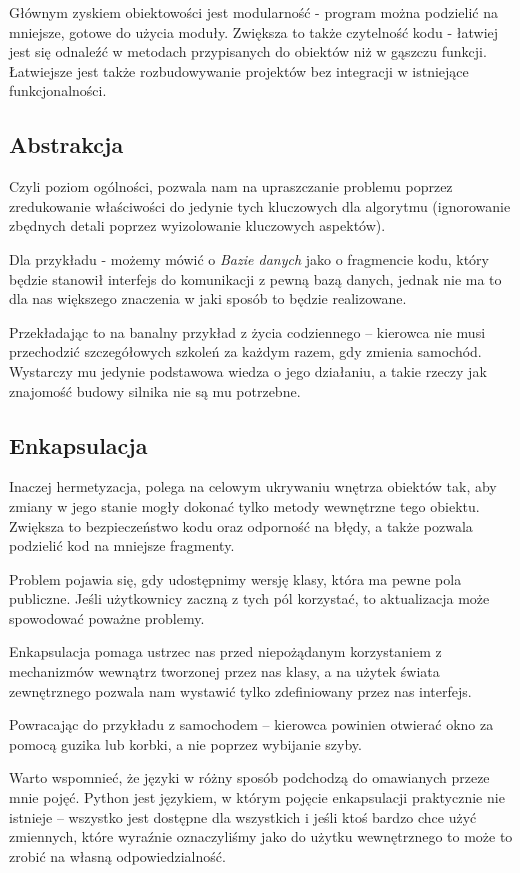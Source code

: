 Głównym zyskiem obiektowości jest modularność - program można podzielić na mniejsze, gotowe do użycia moduły. Zwiększa to także czytelność kodu - łatwiej jest się odnaleźć w metodach przypisanych do obiektów niż w gąszczu funkcji. Łatwiejsze jest także rozbudowywanie projektów bez integracji w istniejące funkcjonalności.

\subsection{Abstrakcja}
Czyli poziom ogólności, pozwala nam na upraszczanie problemu poprzez zredukowanie właściwości do jedynie tych kluczowych dla algorytmu (ignorowanie zbędnych detali poprzez wyizolowanie kluczowych aspektów).

Dla przykładu - możemy mówić o \textit{Bazie danych} jako o fragmencie kodu, który będzie stanowił interfejs do komunikacji z pewną bazą danych, jednak nie ma to dla nas większego znaczenia w jaki sposób to będzie realizowane.

Przekładając to na banalny przykład z życia codziennego -- kierowca nie musi przechodzić szczegółowych szkoleń za każdym razem, gdy zmienia samochód.
Wystarczy mu jedynie podstawowa wiedza o jego działaniu, a takie rzeczy jak znajomość budowy silnika nie są mu potrzebne.

\subsection{Enkapsulacja}
Inaczej hermetyzacja, polega na celowym ukrywaniu wnętrza obiektów tak, aby zmiany w jego stanie mogły dokonać tylko metody wewnętrzne tego obiektu. Zwiększa to bezpieczeństwo kodu oraz odporność na błędy, a także pozwala podzielić kod na mniejsze fragmenty.

Problem pojawia się, gdy udostępnimy wersję klasy, która ma pewne pola publiczne.
Jeśli użytkownicy zaczną z tych pól korzystać, to aktualizacja może spowodować poważne problemy.

Enkapsulacja pomaga ustrzec nas przed niepożądanym korzystaniem z mechanizmów wewnątrz tworzonej przez nas klasy, a na użytek świata zewnętrznego pozwala nam wystawić tylko zdefiniowany przez nas interfejs.

Powracając do przykładu z samochodem -- kierowca powinien otwierać okno za pomocą guzika lub korbki, a nie poprzez wybijanie szyby.

Warto wspomnieć, że języki w różny sposób podchodzą do omawianych przeze mnie pojęć.
Python jest językiem, w którym pojęcie enkapsulacji praktycznie nie istnieje -- wszystko jest dostępne dla wszystkich i jeśli ktoś bardzo chce użyć zmiennych, które wyraźnie oznaczyliśmy jako do użytku wewnętrznego to może to zrobić na własną odpowiedzialność.

